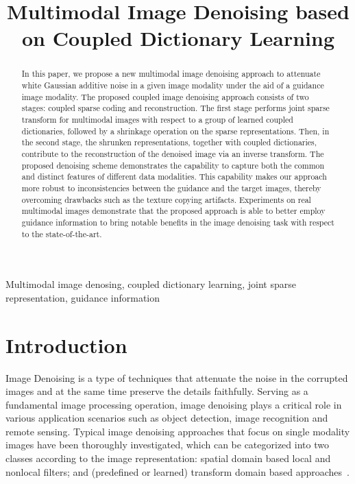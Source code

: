 \documentclass{article}
\title{Multimodal Image Denoising based on Coupled Dictionary Learning}
\begin{document}
\ninept
\maketitle

\begin{abstract}
	In this paper, we propose a new multimodal image denoising approach to attenuate white Gaussian additive noise in a given image modality under the aid of a guidance image modality. 
	The proposed coupled image denoising approach consists of two stages: coupled sparse coding and reconstruction. The first stage performs joint sparse transform for multimodal images with respect to a group of learned coupled dictionaries, followed by a shrinkage operation on the sparse representations. Then, in the second stage, the shrunken representations, together with coupled dictionaries, contribute to the reconstruction of the denoised image via an inverse transform.
	The proposed denoising scheme demonstrates the capability to capture both the common and distinct features of different data modalities. This capability makes our approach more robust to inconsistencies between the guidance and the target images,  thereby overcoming drawbacks such as the texture copying artifacts. Experiments on real multimodal images demonstrate that the proposed approach is able to better employ guidance information to bring notable benefits in the image denoising task with respect to the state-of-the-art.

	
	

\end{abstract}
	

\begin{keywords}
	Multimodal image denosing, coupled dictionary learning, joint sparse representation, guidance information
\end{keywords}



\section{Introduction}
\label{sec:intro}

\vspace{-0.2cm}

Image Denoising is a type of techniques that attenuate the noise in the corrupted images and at the same time preserve the details faithfully. Serving as a fundamental image processing operation, image denoising plays a critical role in various application scenarios such as object detection, image recognition and remote sensing\cite{shao2014heuristic}.
Typical image denoising approaches that focus on single modality images have been thoroughly investigated, which can be categorized into two classes according to the image representation: spatial domain based local and nonlocal filters\cite{zhu2010automatic,bouboulis2010adaptive, buades2005non,nguyen2017bounded,talebi2014global,romano2015boosting}; and (predefined or learned) transform domain based approaches~\cite{dabov2007image, zhang2010two, chatterjee2012patch, elad2006image, mairal2009non}.
\end{document}
